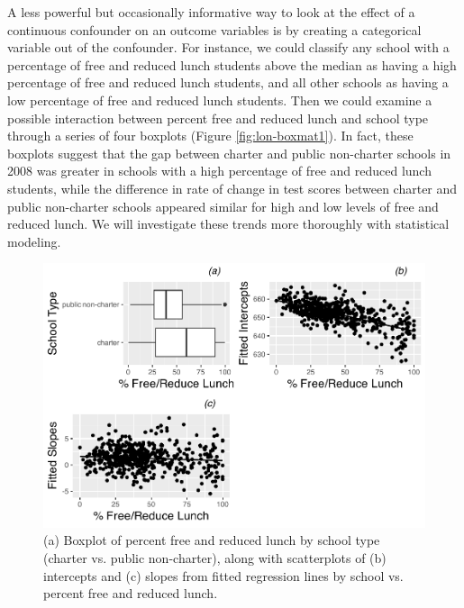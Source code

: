 \documentclass[
]{krantz}
\begin{document}
A less powerful but occasionally informative way to look at the effect of a continuous confounder on an outcome variables is by creating a categorical variable out of the confounder. For instance, we could classify any school with a percentage of free and reduced lunch students above the median as having a high percentage of free and reduced lunch students, and all other schools as having a low percentage of free and reduced lunch students. Then we could examine a possible interaction between percent free and reduced lunch and school type through a series of four boxplots (Figure \ref{fig:lon-boxmat1}). In fact, these boxplots suggest that the gap between charter and public non-charter schools in 2008 was greater in schools with a high percentage of free and reduced lunch students, while the difference in rate of change in test scores between charter and public non-charter schools appeared similar for high and low levels of free and reduced lunch. We will investigate these trends more thoroughly with statistical modeling.

\begin{figure}

{\centering \includegraphics[width=0.6\linewidth]{bookdown-BeyondMLR_files/figure-latex/lon-boxcatmat1-1} 

}

\caption{(a) Boxplot of percent free and reduced lunch by school type (charter vs. public non-charter), along with scatterplots of (b) intercepts and (c) slopes from fitted regression lines by school vs. percent free and reduced lunch.}\label{fig:lon-boxcatmat1}
\end{figure}
\end{document}
